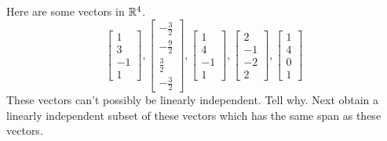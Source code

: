 \documentclass{ximera}
\begin{document}
\begin{problem}\label{prb:3.30} Here are some vectors in $\mathbb{R}^{4}$.
\begin{equation*}
\left[
\begin{array}{r}
1 \\
3 \\
-1 \\
1
\end{array}
\right] ,\left[
\begin{array}{r}
-\frac{3}{2} \\
-\frac{9}{2} \\
\frac{3}{2} \\
-\frac{3}{2}
\end{array}
\right] ,\left[
\begin{array}{r}
1 \\
4 \\
-1 \\
1
\end{array}
\right] ,\left[
\begin{array}{r}
2 \\
-1 \\
-2 \\
2
\end{array}
\right] ,\left[
\begin{array}{r}
1 \\
4 \\
0 \\
1
\end{array}
\right]
\end{equation*}
These vectors can't possibly be linearly independent. Tell why. Next obtain a
linearly independent subset of these vectors which has the same span as
these vectors. 
\end{problem}
\end{document}
